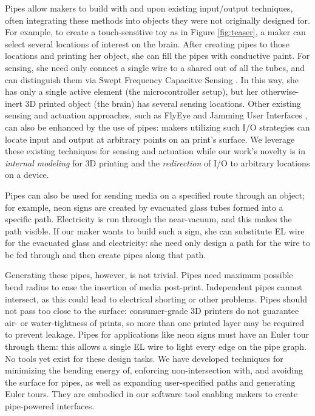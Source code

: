 Pipes allow makers to build with and upon existing input/output techniques, often integrating these methods into objects they were not originally designed for.   For example, to create a touch-sensitive toy as in Figure \ref{fig:teaser}, a maker can select several locations of interest on the brain.  After creating pipes to those locations and printing her object, she can fill the pipes with conductive paint.  For sensing, she need only connect a single wire to a shared out of all the tubes, and can distinguish them via Swept Frequency Capacitve Sensing \cite{Sato-touche}.  In this way, she has only a single active element (the microcontroller setup), but her otherwise-inert 3D printed object (the brain) has several sensing locations.  Other existing sensing and actuation approaches, such as FlyEye \cite{Wimmer-flyeye} and Jamming User Interfaces \cite{Follmer-jamming}, can also be enhanced by the use of pipes: makers utilizing such I/O strategies can locate input and output at arbitrary points on an print's surface.  We leverage these existing techniques for sensing and actuation while our work's novelty is in \emph{internal modeling} for 3D printing and the \emph{redirection} of I/O to arbitrary locations on a device.

Pipes can also be used for sending media on a specified route through an object; for example, neon signs are created by evacuated glass tubes formed into a specific path.  Electricity is run through the near-vacuum, and this makes the path visible.  If our maker wants to build such a sign, she can substitute EL wire for the evacuated glass and electricity: she need only design a path for the wire to be fed through and then create pipes along that path.

Generating these pipes, however, is not trivial.  Pipes need maximum possible bend radius to ease the insertion of media post-print.  Independent pipes cannot intersect, as this could lead to electrical shorting or other problems.  Pipes should not pass too close to the surface: consumer-grade 3D printers do not guarantee air- or water-tightness of prints, so more than one printed layer may be required to prevent leakage.  Pipes for applications like neon signs must have an Euler tour through them: this allows a single EL wire to light every edge on the pipe graph.  No tools yet exist for these design tasks.  We have developed techniques for minimizing the bending energy of, enforcing non-intersection with, and avoiding the surface for pipes, as well as expanding user-specified paths and generating Euler tours.  They are embodied in our software tool enabling makers to create pipe-powered interfaces.

